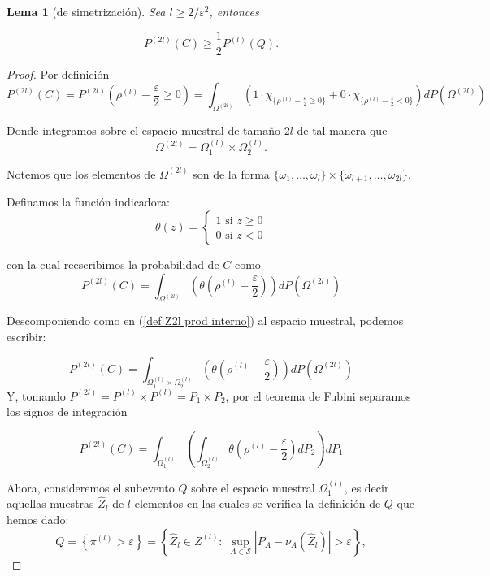 \documentclass{report}
\newtheorem{lem}{Lema}[section]
\begin{document}
\begin{lem} [de simetrización]
    Sea \( l \geq 2 / \varepsilon^2 \), entonces

    \[
    P^{(2l)}(C) \geq \frac{1}{2} P^{(l)}(Q).
    \]
\end{lem}
\begin{proof}
Por definición
\begin{equation*}
P^{(2l)}(C) = P^{(2l)}\left(\rho^{(l)}-\frac{\varepsilon}{2}\geq 0\right) = \int_{\Omega^{(2l)}} \left( 1 \cdot \chi_{\{\rho^{(l)}-\frac{\varepsilon}{2}\geq 0\}} + 
0 \cdot \chi_{\{\rho^{(l)}-\frac{\varepsilon}{2}< 0\}} \right) dP(\Omega^{(2l)})
\end{equation*}

Donde integramos sobre el espacio muestral de tamaño $2l$ de tal manera que
\begin{equation}
    \Omega^{(2l)} = \Omega_1^{(l)}\times \Omega_2^{(l)}.  \label{def Z2l prod interno}
\end{equation}

Notemos que los elementos de $\Omega^{(2l)}$ son de la forma $ \{\omega_1,\ldots,\omega_l\} \times \{\omega_{l+1},\dots,\omega_{2l}\}$.\newline

Definamos la función indicadora: 
\[
\theta(z)=\begin{cases}
    1 \text{ si } z\geq 0 \\
    0 \text{ si } z< 0
\end{cases}  
\]

con la cual reescribimos la probabilidad de $C$ como
\begin{equation}
P^{(2l)}(C) = \int_{\Omega^{(2l)}} \left( \theta\left(\rho^{(l)}-\frac{\varepsilon}{2}\right)\right) dP(\Omega^{(2l)})
\end{equation}

Descomponiendo como en (\ref{def Z2l prod interno}) al espacio muestral, podemos escribir:

\[
P^{(2l)}(C) = \int_{\Omega_1^{(l)}\times \Omega_2^{(l)}} \left( \theta\left(\rho^{(l)}-\frac{\varepsilon}{2}\right)\right) dP(\Omega^{(2l)})
\]
Y, tomando $P^{(2l)}=P^{(l)}\times P^{(l)} = P_1\times P_2$, por el teorema de Fubini separamos los signos de integración

\[
P^{(2l)}(C) = \int_{\Omega_1^{(l)}} \left( \int_{ \Omega_2^{(l)}}  \theta\left(\rho^{(l)}-\frac{\varepsilon}{2}\right) dP_2\right) dP_1
\]

Ahora, consideremos el subevento $Q$ sobre el espacio muestral $\Omega_1^{(l)}$, es decir aquellas muestras $\hat{Z}_l$ de $l$
elementos en las cuales se verifica la definición de $Q$ que hemos dado:
\[
Q = \left\{ \pi^{(l)} > \varepsilon \right\} = \left\{\hat{Z}_l\in Z^{(l)}:\; 
\sup_{A\in\mathcal{S}}\left|P_A - \nu_A\left(\hat{Z}_l\right)\right| > \varepsilon \right\},
\]


\end{proof}
\end{document}

